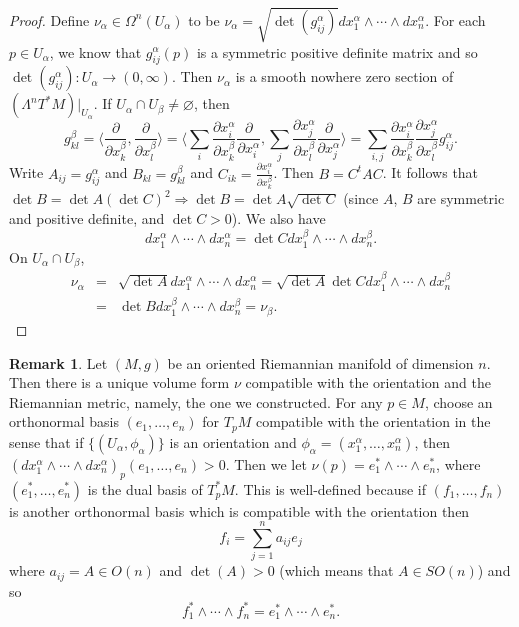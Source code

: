 \documentclass{amsart}
\numberwithin{equation}{section}
\theoremstyle{definition}
\newtheorem{remark}[definition]{Remark}
\theoremstyle{theorem}
\begin{document}
\begin{proof}
 Define $\nu_\alpha\in \Omega^n(U_\alpha)$ to be $\nu_\alpha = \sqrt{\det(g_{ij}^\alpha)} dx_1^\alpha \wedge \cdots \wedge dx_n^\alpha$. For each $p \in U_\alpha$, we know that $g_{ij}^\alpha(p)$ is a symmetric positive definite matrix and so $\det(g_{ij}^\alpha) : U_\alpha \to (0,\infty)$. Then $\nu_\alpha$ is a smooth nowhere zero section of $(\Lambda^nT^*M)|_{U_\alpha}$. If $U_\alpha \cap U_\beta \ne \varnothing$, then 
\[
g_{kl}^\beta = \langle \frac{\partial}{\partial x_k^\beta}, \frac{\partial}{\partial x_l^\beta} \rangle = \langle \sum_{i} \frac{\partial x_i^\alpha}{\partial x_k^\beta} \frac{\partial}{\partial x_i^\alpha}, \sum_{j} \frac{\partial x_j^\alpha}{\partial x_l^\beta} \frac{\partial}{\partial x_j^\alpha} \rangle = \sum_{i,j} \frac{\partial x_i^\alpha}{\partial x_k^\beta} \frac{\partial x_j^\alpha}{\partial x_l^\beta} g_{ij}^\alpha.
\]
Write $A_{ij} = g_{ij}^\alpha$ and $B_{kl} = g_{kl}^\beta$ and $C_{ik} = \frac{\partial x_i^\alpha}{\partial x_k^\beta}$. Then  $B = C^tAC$. It follows that
$\det B = \det A (\det C)^2 \Rightarrow \det B = \det A \sqrt{\det C}$ 
(since $A$, $B$ are symmetric and positive definite, and $\det C>0$).  We also have
$$
dx_1^\alpha \wedge \cdots \wedge dx_n^\alpha = 
\det C dx_1^\beta\wedge \cdots \wedge dx_n^\beta.
$$
On $U_\alpha\cap U_\beta$, 
\begin{eqnarray*}
\nu_\alpha  &=& \sqrt{\det A}  dx_1^\alpha \wedge \cdots \wedge dx_n^\alpha
=\sqrt{\det A}\det C dx_1^\beta\wedge \cdots \wedge dx_n^\beta\\
&=& \det B dx_1^\beta\wedge \cdots \wedge dx_n^\beta =\nu_\beta.
\end{eqnarray*}
\end{proof}

\begin{remark}
Let $(M,g)$ be an oriented Riemannian manifold of dimension $n$. Then there is a unique volume form $\nu$ compatible with the orientation and the Riemannian metric, namely, the one we constructed. For any $p \in M$, choose an orthonormal basis $(e_1, \ldots, e_n)$ for $T_pM$ compatible with the orientation in the sense that if $\{(U_\alpha, \phi_\alpha)\}$ is an orientation and $\phi_\alpha = (x_1^\alpha, \ldots, x_n^\alpha)$, then $(dx_1^\alpha \wedge \cdots \wedge dx_n^\alpha)_p(e_1, \ldots, e_n) > 0$. Then we let $\nu(p) = e_1^* \wedge \cdots \wedge e_n^*$, where $(e_1^*,\ldots, e_n^*)$ is
the dual basis of $T^*_p M$. This is well-defined because if $(f_1, \ldots, f_n)$ is another orthonormal basis which is compatible with the orientation then 
\[
f_i = \sum_{j=1}^n a_{ij} e_j
\]
where $a_{ij} = A \in O(n)$ and $\det (A) > 0$ (which means that $A \in SO(n)$) and so 
\[
f_1^* \wedge \cdots \wedge f_n^* = e_1^* \wedge \cdots \wedge e_n^*. 
\]
\end{remark}
\end{document}
